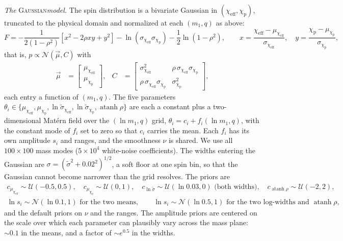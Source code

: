 \documentclass[%
 reprint,
 amsmath,amssymb,
 aps,
 prl,
 nofootinbib,nobibnotes,
 floatfix,
]{revtex4-2}
\newcommand{\chieff}{\ensuremath{\chi_{\mathrm{eff}}}}
\newcommand{\chip}{\ensuremath{\chi_{\mathrm{p}}}}
\newcommand{\gaussianspins}{\textsc{Gaussian}\xspace}
\begin{document}
\textit{The} \gaussianspins \textit{model.} The spin distribution is a bivariate Gaussian in $(\chieff, \chip)$, truncated to the physical domain and normalized at each $(m_1, q)$ as above:
\begin{equation}
    F = -\frac{1}{2(1 - \rho^2)}\left[x^2 - 2\rho x y + y^2\right] - \ln(\sigma_{\chieff} \sigma_{\chip}) - \frac{1}{2}\ln(1 - \rho^2), \qquad
    x = \frac{\chieff - \mu_{\chieff}}{\sigma_{\chieff}}, \quad y = \frac{\chip - \mu_{\chip}}{\sigma_{\chip}},
\end{equation}
that is, $p \propto \mathcal{N}(\vec{\mu}, C)$ with
\begin{align}
    \vec{\mu} &= \begin{bmatrix} \mu_{\chieff} \\ \mu_{\chip} \end{bmatrix}, &
    C &= \begin{bmatrix}
    \sigma^2_{\chieff} & \rho\,\sigma_{\chieff}\sigma_{\chip} \\
    \rho\,\sigma_{\chieff}\sigma_{\chip} & \sigma^2_{\chip}
    \end{bmatrix}, \label{eq: gaussian cov}
\end{align}
each entry a function of $(m_1, q)$. The five parameters $\theta_i \in \{\mu_{\chieff}, \mu_{\chip}, \ln\tilde{\sigma}_{\chieff}, \ln\tilde{\sigma}_{\chip}, \operatorname{atanh}\rho\}$ are each a constant plus a two-dimensional Mat\'ern field over the $(\ln m_1, q)$ grid, $\theta_i = c_i + f_i(\ln m_1, q)$, with the constant mode of $f_i$ set to zero so that $c_i$ carries the mean. Each $f_i$ has its own amplitude $s_i$ and ranges, and the smoothness $\nu$ is shared. We use all $100 \times 100$ mass modes ($5 \times 10^4$ white-noise coefficients). The widths entering the Gaussian are $\sigma = (\tilde{\sigma}^2 + 0.02^2)^{1/2}$, a soft floor at one spin bin, so that the Gaussian cannot become narrower than the grid resolves. The priors are
\begin{gather}
    c_{\mu_{\chieff}} \sim \mathcal{U}(-0.5, 0.5), \quad c_{\mu_{\chip}} \sim \mathcal{U}(0, 1), \quad c_{\ln\tilde{\sigma}} \sim \mathcal{U}(\ln 0.03, 0) \text{ (both widths)}, \quad c_{\operatorname{atanh}\rho} \sim \mathcal{U}(-2, 2), \\
    \ln s_i \sim \mathcal{N}(\ln 0.1, 1) \text{ for the two means}, \qquad \ln s_i \sim \mathcal{N}(\ln 0.5, 1) \text{ for the two log-widths and } \operatorname{atanh}\rho,
\end{gather}
and the default priors on $\nu$ and the ranges. The amplitude priors are centered on the scale over which each parameter can plausibly vary across the mass plane: $\sim 0.1$ in the means, and a factor of $\sim e^{0.5}$ in the widths.
\end{document}
